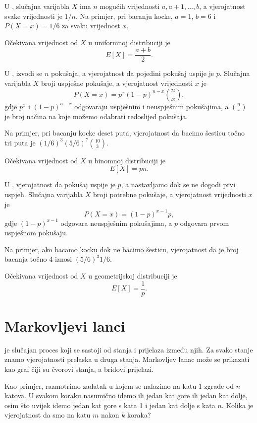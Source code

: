 U ,
slučajna varijabla $X$ ima $n$ mogućih
vrijednosti $a,a+1,\ldots,b$, a vjerojatnost svake vrijednosti je $1/n$.
Na primjer, pri bacanju kocke,
$a=1$, $b=6$ i $P(X=x)=1/6$ za svaku vrijednost $x$.

Očekivana vrijednost od $X$ u uniformnoj distribuciji je
\[E[X] = \frac{a+b}{2}.\]

U , izvodi se $n$ pokušaja,
a vjerojatnost da pojedini pokušaj uspije
je $p$.
Slučajna varijabla $X$ broji
uspješne pokušaje,
a vjerojatnost vrijednosti $x$ je
\[P(X=x)=p^x (1-p)^{n-x} {n \choose x},\]
gdje $p^x$ i $(1-p)^{n-x}$ odgovaraju
uspješnim i neuspješnim pokušajima,
a ${n \choose x}$ je broj načina na koje
možemo odabrati redoslijed pokušaja.

Na primjer, pri bacanju kocke deset puta,
vjerojatnost da bacimo šesticu točno
tri puta je $(1/6)^3 (5/6)^7 {10 \choose 3}$.

Očekivana vrijednost od $X$ u binomnoj distribuciji je
\[E[X] = pn.\]

U ,
vjerojatnost da pokušaj uspije je $p$,
a nastavljamo dok se ne dogodi prvi uspjeh.
Slučajna varijabla $X$ broji
potrebne pokušaje, a vjerojatnost
vrijednosti $x$ je
\[P(X=x)=(1-p)^{x-1} p,\]
gdje $(1-p)^{x-1}$ odgovara neuspješnim pokušajima,
a $p$ odgovara prvom uspješnom pokušaju.

Na primjer, ako bacamo kocku dok ne bacimo šesticu,
vjerojatnost da je broj bacanja
točno 4 iznosi $(5/6)^3 1/6$.

Očekivana vrijednost od $X$ u geometrijskoj distribuciji je
\[E[X]=\frac{1}{p}.\]

\section{Markovljevi lanci}


je slučajan proces
koji se sastoji od stanja i prijelaza između njih.
Za svako stanje znamo vjerojatnosti
prelaska u druga stanja.
Markovljev lanac može se prikazati kao graf
čiji su čvorovi stanja, a bridovi prijelazi.

Kao primjer, razmotrimo zadatak
u kojem se nalazimo na katu 1 zgrade od $n$ katova.
U svakom koraku nasumično idemo ili jedan kat
gore ili jedan kat dolje, osim što uvijek
idemo jedan kat gore s kata 1 i jedan kat dolje
s kata $n$.
Kolika je vjerojatnost da smo na katu $m$
nakon $k$ koraka?

